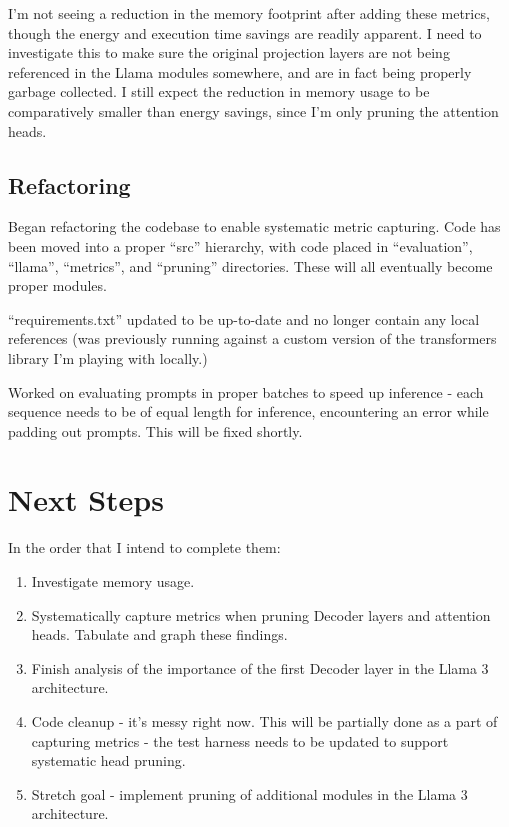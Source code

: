 \documentclass{article}
\begin{document}
    I'm not seeing a reduction in the memory footprint after adding these metrics, though the energy and execution time savings are readily apparent.
    I need to investigate this to make sure the original projection layers are not being referenced in the Llama modules somewhere, and are in fact being properly garbage collected.
    I still expect the reduction in memory usage to be comparatively smaller than energy savings, since I'm only pruning the attention heads.

    \subsection{Refactoring}\label{subsec:refactoring}

    Began refactoring the codebase to enable systematic metric capturing.
    Code has been moved into a proper ``src'' hierarchy, with code placed in ``evaluation'', ``llama'', ``metrics'', and ``pruning'' directories.
    These will all eventually become proper modules.

    ``requirements.txt'' updated to be up-to-date and no longer contain any local references (was previously running against a custom version of the transformers library I'm playing with locally.)

    Worked on evaluating prompts in proper batches to speed up inference - each sequence needs to be of equal length for inference, encountering an error while padding out prompts.
    This will be fixed shortly.

    \section{Next Steps}\label{sec:next-steps}

    In the order that I intend to complete them:

    \begin{enumerate}
        \item Investigate memory usage.
        \item Systematically capture metrics when pruning Decoder layers and attention heads.
        Tabulate and graph these findings.
        \item Finish analysis of the importance of the first Decoder layer in the Llama 3 architecture.
        \item Code cleanup - it's messy right now.
        This will be partially done as a part of capturing metrics - the test harness needs to be updated to support systematic head pruning.
        \item Stretch goal - implement pruning of additional modules in the Llama 3 architecture.
    \end{enumerate}
\end{document}

